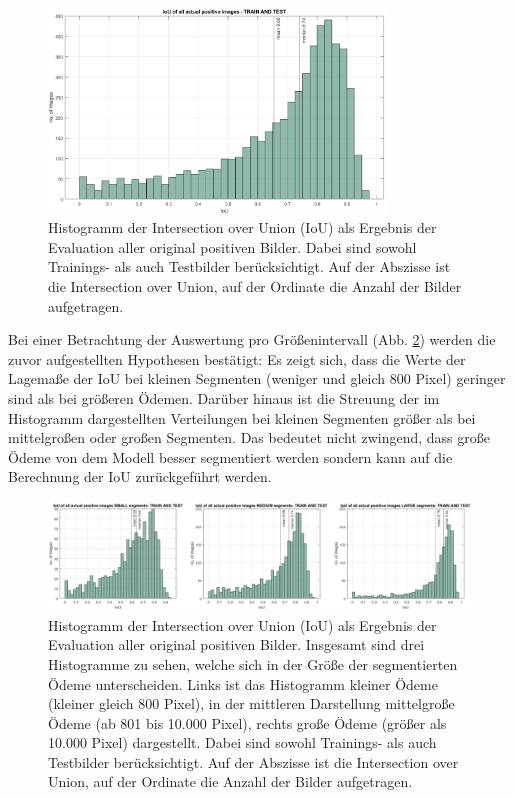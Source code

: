 \begin{figure}[H]
\centering
\includegraphics[width=0.8\textwidth]{./pic/Segmentierung/iou_pos_traintest.png}
\caption{\label{fig:iou_pos_traintest}Histogramm der Intersection over Union (IoU) als Ergebnis der Evaluation aller original positiven Bilder. Dabei sind sowohl Trainings- als auch Testbilder berücksichtigt. Auf der Abszisse ist die Intersection over Union, auf der Ordinate die Anzahl der Bilder aufgetragen.}
\end{figure}

Bei einer Betrachtung der Auswertung pro Größenintervall (Abb. \ref{fig:iou_pos_traintest_persize}) werden die zuvor aufgestellten Hypothesen bestätigt: Es zeigt sich, dass die Werte der Lagemaße der IoU bei kleinen Segmenten (weniger und gleich 800 Pixel) geringer sind als bei größeren Ödemen. Darüber hinaus ist die Streuung der im Histogramm dargestellten Verteilungen bei kleinen Segmenten größer als bei mittelgroßen oder großen Segmenten. Das bedeutet nicht zwingend, dass große Ödeme von dem Modell besser segmentiert werden sondern kann auf die Berechnung der IoU zurückgeführt werden.

\begin{figure}[H]
\centering
\includegraphics[width=\textwidth]{./pic/Segmentierung/iou_pos_traintest_persize.png}
\caption{\label{fig:iou_pos_traintest_persize}Histogramm der Intersection over Union (IoU) als Ergebnis der Evaluation aller original positiven Bilder. Insgesamt sind drei Histogramme zu sehen, welche sich in der Größe der segmentierten Ödeme unterscheiden. Links ist das Histogramm kleiner Ödeme (kleiner gleich 800 Pixel), in der mittleren Darstellung mittelgroße Ödeme (ab 801 bis 10.000 Pixel), rechts große Ödeme (größer als 10.000 Pixel) dargestellt. Dabei sind sowohl Trainings- als auch Testbilder berücksichtigt. Auf der Abszisse ist die Intersection over Union, auf der Ordinate die Anzahl der Bilder aufgetragen.}
\end{figure}
\newpage
